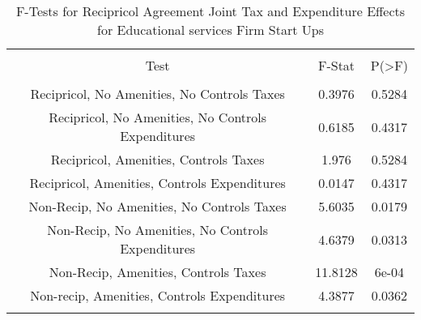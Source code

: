 
\begin{table}[!htbp] \centering 
  \caption{F-Tests for Recipricol Agreement Joint Tax and Expenditure Effects for Educational services Firm Start Ups} 
  \label{61Ftests} 
\begin{tabular}{@{\extracolsep{5pt}} ccc} 
\\[-1.8ex]\hline 
\hline \\[-1.8ex] 
Test & F-Stat & P(\textgreater F) \\ 
\hline \\[-1.8ex] 
Recipricol, No Amenities, No Controls Taxes & 0.3976 & 0.5284 \\ 
Recipricol, No Amenities, No Controls Expenditures & 0.6185 & 0.4317 \\ 
Recipricol, Amenities, Controls Taxes & 1.976 & 0.5284 \\ 
Recipricol, Amenities, Controls Expenditures & 0.0147 & 0.4317 \\ 
Non-Recip, No Amenities, No Controls Taxes & 5.6035 & 0.0179 \\ 
Non-Recip, No Amenities, No Controls Expenditures & 4.6379 & 0.0313 \\ 
Non-Recip, Amenities, Controls Taxes & 11.8128 & 6e-04 \\ 
Non-recip, Amenities, Controls Expenditures & 4.3877 & 0.0362 \\ 
\hline \\[-1.8ex] 
\end{tabular} 
\end{table} 
